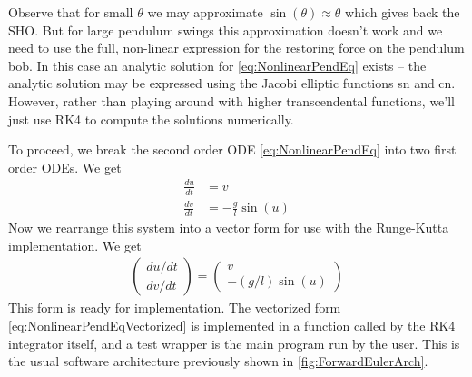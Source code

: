 \documentclass[hidelinks,notitlepage]{book}
\begin{document}
Observe that for small $\theta$ we may approximate $\sin(\theta) \approx \theta$ which gives back the SHO.  But for large pendulum swings this approximation doesn't work and we need to use the full, non-linear expression for the restoring force on the pendulum bob.  In this case an analytic solution for \cref{eq:NonlinearPendEq} exists -- the analytic solution may be expressed using the Jacobi elliptic functions sn and cn.  However, rather than playing around with higher transcendental functions, we'll just use RK4 to compute the solutions numerically.

To proceed, we break the second order ODE \cref{eq:NonlinearPendEq} into two first order ODEs.  We get
\begin{align}
\label{eq:NonlinearPendEqTwoODEs}
\nonumber
\frac{du}{dt} &= v \\
\nonumber
\frac{dv}{dt} &= -\frac{g}{l} \sin(u)
\end{align}
Now we rearrange this system into a vector form for use with the Runge-Kutta implementation.  We get
\begin{equation}
\begin{aligned}
\label{eq:NonlinearPendEqVectorized}
\begin{pmatrix}
du/dt \\
dv/dt
\end{pmatrix} 
=
\begin{pmatrix}
v \\
-(g/l) \sin(u)
\end{pmatrix} 
\end{aligned}
\end{equation}
This form is ready for implementation.  The vectorized form \cref{eq:NonlinearPendEqVectorized} is
implemented in a function called by the RK4 integrator itself, and a test wrapper is the main program run by the user.  This is the usual software architecture previously shown in \cref{fig:ForwardEulerArch}.
\end{document}
